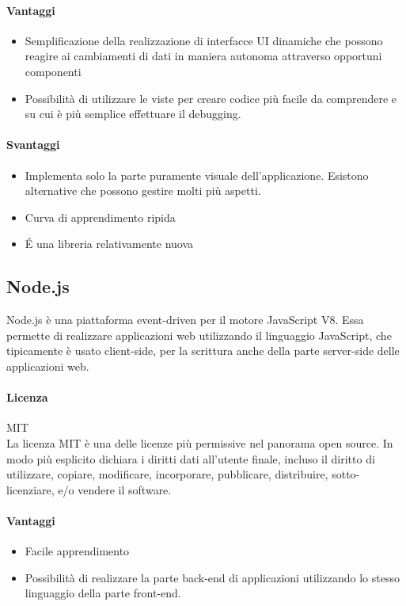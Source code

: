 \paragraph{Vantaggi}
\begin{itemize}
	\item Semplificazione della realizzazione di interfacce UI dinamiche che possono reagire ai cambiamenti di dati in maniera autonoma attraverso opportuni componenti
	\item Possibilità di utilizzare le viste per creare codice più facile da comprendere e su cui è più semplice effettuare il debugging.
	
\end{itemize}

\paragraph{Svantaggi} 
\begin{itemize}
	\item Implementa solo la parte puramente visuale
     dell'applicazione. Esistono alternative che possono gestire molti
     più aspetti.
	\item Curva di apprendimento ripida
	\item \'E una libreria relativamente nuova
\end{itemize}

\subsection{Node.js}

Node.js è una piattaforma event-driven per il motore JavaScript
V8. Essa permette di realizzare applicazioni web utilizzando il
linguaggio JavaScript, che tipicamente è usato client-side, per la scrittura anche
della parte server-side delle applicazioni web. 
\\
\paragraph{Licenza} MIT \\
La licenza MIT è una delle licenze più permissive nel panorama open
source. In modo più esplicito dichiara i diritti dati all'utente
finale, incluso il diritto di utilizzare, copiare, modificare,
incorporare, pubblicare, distribuire, sotto-licenziare, e/o vendere il
software. \\

\paragraph{Vantaggi}
\begin{itemize}
	\item Facile apprendimento
	\item Possibilità di realizzare la parte back-end di applicazioni utilizzando lo stesso linguaggio della parte front-end.
\end{itemize}

